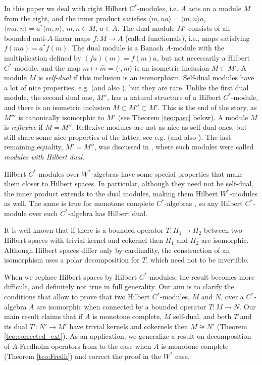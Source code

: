 \documentclass[12pt]{amsart}
\def\<{\langle}
\def\>{\rangle}
\begin{document}
In this paper we deal with right Hilbert $C^*$-modules, i.e. $A$ acts on a module $M$ from the right, and the inner product satisfies
$\<m,n a\>=\<m,n\>a$, $\<ma,n\>=a^*\<m,n\>$, $m,n \in M$, $a \in A$.
The dual module $M'$ consists of all bounded anti-$A$-linear maps $f:M\to A$ (called functionals),
i.e., maps satisfying $f(ma)=a^*f(m)$. 
The dual module is a Banach $A$-module with the multiplication defined by $(fa)(m)=f(m)a$, but not necessarily a Hilbert $C^*$-module, and the map $m\mapsto\widehat m=\langle \cdot,m\rangle$ is an isometric inclusion $M\subset M'$.  
A module $M$ is \emph{self-dual} if this inclusion is an isomorphism. Self-dual modules have a lot of nice properties, e.g. \cite{Pas1,Frank1990} (and also \cite{MTBook}), but they are rare. Unlike the first dual module, the second dual one, $M''$, has a natural structure of a Hilbert $C^*$-module, and there is an isometric inclusion $M\subset M''\subset M'$. This is the end of the story, as $M'''$ is canonically isomorphic to $M'$ \cite[Theorem ~2.4]{Pas2} (see Theorem \ref{teo:pasc} below). 
A module $M$ is \emph{reflexive} if $M=M''$. Reflexive modules are not as nice as self-dual ones, but still share some nice properties of the latter, see e.g. \cite{Frank1990,FMT2010NY,FMT2010Studia}
(and also \cite{MTBook}). The last remaining equality, $M'=M''$, was discussed in \cite{Manuilov2022}, where such modules were called \emph{modules with Hilbert dual}.

Hilbert $C^*$-modules over $W^*$-algebras have some special properties that make them closer to Hilbert spaces. In particular, although they need not be self-dual, the inner product extends to the dual modules, making them Hilbert $W^*$-modules as well. The same is true for monotone complete $C^*$-algebras \cite{FrankMaNa}, so any Hilbert $C^*$-module over such $C^*$-algebra has Hilbert dual. 

\medskip

It is well known that if there is a bounded operator $T:H_1\to H_2$ between two Hilbert spaces with trivial kernel and cokernel then $H_1$ and $H_2$ are isomorphic. Although Hilbert spaces differ only by cardinality, the construction of an isomorphism uses a polar decomposition for $T$, which need not to be invertible. 

When we replace Hilbert spaces by Hilbert $C^*$-modules, the result becomes more difficult, and definitely not true in full generality. Our aim is to clarify the conditions that allow to prove that two Hilbert $C^*$-modules, $M$ and $N$, over a $C^*$-algebra $A$ are isomorphic when connected by a bounded operator $T:M\to N$. Our main result claims that if $A$ is monotone complete, $M$ self-dual, and both $T$ and its dual $T':N'\to M'$ have trivial kernels and cokernels then $M\cong N'$ (Theorem \ref{teo:corrected_ext}). As an application, we generalize a result on decomposition of $A$-Fredholm operators from \cite{FrTroFA} to the case when $A$ is monotone complete 
(Theorem \ref{teo:Fredh}) and correct the proof in the $W^*$ case. 
\end{document}
